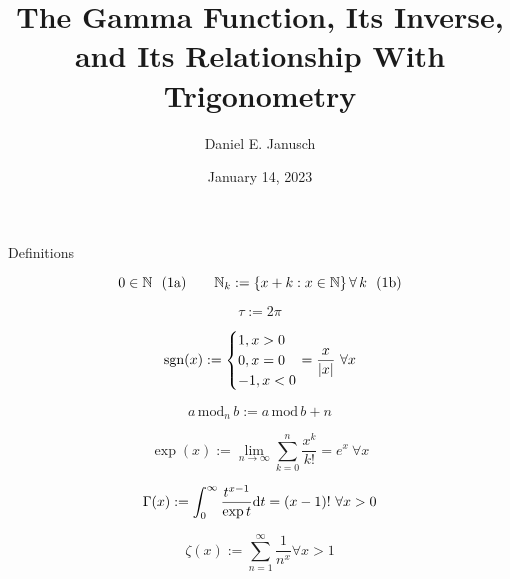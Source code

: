 \documentclass[12pt]{article}
\begin{document}
\title{The Gamma Function, Its Inverse, and Its Relationship With Trigonometry}
\author{Daniel E. Janusch}
\date{January 14, 2023} %
\maketitle

\begin{section}{Definitions}

	\begin{equation}
		0\in\mathbb N~~(1\text a)\hspace{2em}\mathbb N_k:=\left\{x+k:x\in\mathbb N\right\}\forall\,k~~(1\text b)
	\end{equation} %

	\vspace{-0.065em}\begin{equation}
		\tau:=2\pi
	\end{equation} %

	\vspace{-0.065em}\begin{equation}
		\text{sgn}(x):=\begin{cases}
			1,x>0\\
			0,x=0\\
			-1,x<0
		\end{cases}\hspace{-1em}=\dfrac x{|x|}~\forall x
	\end{equation} %

	\vspace{-0.065em}\begin{equation}
		a\,\text{mod}_n\,b:=a\,\text{mod}\,b+n
	\end{equation} %

	\vspace{-0.065em}\begin{equation}
		\exp(x):=\lim_{n\to\infty}\sum_{k=0}^n\dfrac{x^k}{k!}=e^x~\forall x
	\end{equation} %

	\vspace{-0.065em}\begin{equation}
		\Gamma(x):=\int_0^\infty\dfrac{t^{x-1}}{\exp t}\text dt=(x-1)!~\forall x>0
	\end{equation} %

	\vspace{-0.065em}\begin{equation}
		\zeta(x):=\sum_{n=1}^\infty\dfrac1{n^x}\forall x>1
	\end{equation} %


\end{section}
\end{document}

